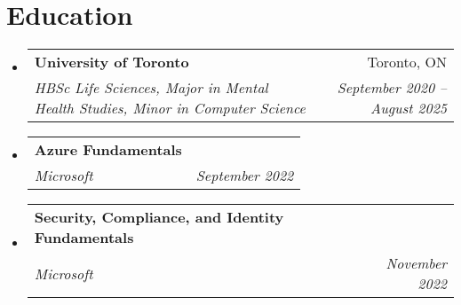 \documentclass[letterpaper,11pt]{article}
\makeatletter
\newcommand{\resumeItem}[1]{
  \item\small{
    {#1 \vspace{-2pt}}
  }
}
\newcommand{\resumeSubheading}[4]{
  \vspace{-2pt}\item
    \begin{tabular*}{0.97\textwidth}[t]{l@{\extracolsep{\fill}}r}
      \textbf{#1} & #2 \\
      \textit{\small#3} & \textit{\small #4} \\
    \end{tabular*}\vspace{-7pt}
}
\newcommand{\resumeProjectHeading}[2]{
    \item
    \begin{tabular*}{0.97\textwidth}{l@{\extracolsep{\fill}}r}
      \small#1 & #2 \\
    \end{tabular*}\vspace{-7pt}
}
\newcommand{\resumeSubHeadingListStart}{\begin{itemize}[leftmargin=0.15in, label={}]}
\newcommand{\resumeSubHeadingListEnd}{\end{itemize}}
\newcommand{\resumeItemListStart}{\begin{itemize}}
\newcommand{\resumeItemListEnd}{\end{itemize}\vspace{-5pt}}
\makeatother
\begin{document}


\section{Education}
  \resumeSubHeadingListStart
    \resumeSubheading
      {University of Toronto}{Toronto, ON}
      {HBSc Life Sciences, Major in Mental Health Studies, Minor in Computer Science}{September 2020 -- August 2025}
    \resumeSubheading
      {Azure Fundamentals}{}
      {Microsoft}{September 2022}
    \resumeSubheading
      {Security, Compliance, and Identity Fundamentals}{}
      {Microsoft}{November 2022}
  \resumeSubHeadingListEnd

\end{document}
